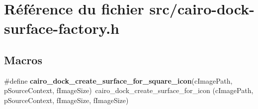 \section{Référence du fichier src/cairo-dock-surface-factory.h}
\label{cairo-dock-surface-factory_8h}
\subsection*{Macros}
\begin{CompactItemize}
\item 
\#define {\bf cairo\_\-dock\_\-create\_\-surface\_\-for\_\-square\_\-icon}(cImagePath, pSourceContext, fImageSize)~cairo\_\-dock\_\-create\_\-surface\_\-for\_\-icon (cImagePath, pSourceContext, fImageSize, fImageSize)
\end{CompactItemize}
